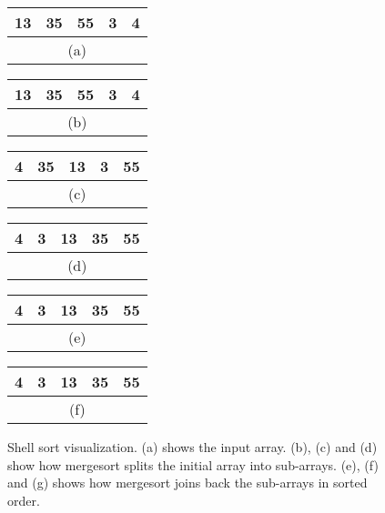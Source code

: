\begin{figure}[!ht]
    \centering
    \begin{tabular}{|c|c|c|c|c|}
    \hline
    13 & 35 & 55 & 3 & 4 \\
    \hline
    \multicolumn{5}{c}{(a)} \\
    \end{tabular}
    \quad\quad\quad
    \begin{tabular}{|c|c|c|c|c|}
    \hline
    \cellcolor{lightgray}13 & 35 & \cellcolor{lightgray}55 & 3 & \cellcolor{lightgray}4 \\
    \hline
    \multicolumn{5}{c}{(b)} \\
    \end{tabular}
    \break
    \begin{tabular}{|c|c|c|c|c|}
    \hline
    \cellcolor{lightgray}4 & 35 & \cellcolor{lightgray}13 & 3 & \cellcolor{lightgray}55 \\
    \hline
    \multicolumn{5}{c}{(c)} \\
    \end{tabular}
    \quad\quad\quad
    \begin{tabular}{|c|c|c|c|c|}
    \hline
    \cellcolor{lightgray}4 & 3 & \cellcolor{lightgray}13 & 35 & \cellcolor{lightgray}55 \\
    \hline
    \multicolumn{5}{c}{(d)} \\
    \end{tabular}
    \break
    \begin{tabular}{|c|c|c|c|c|}
    \hline
    \cellcolor{lightgray}4 & \cellcolor{lightgray}3 & \cellcolor{lightgray}13 & \cellcolor{lightgray}35 & \cellcolor{lightgray}55 \\
    \hline
    \multicolumn{5}{c}{(e)} \\
    \end{tabular}
    \quad\quad\quad
    \begin{tabular}{|c|c|c|c|c|}
    \hline
    \cellcolor{lightgray}4 & \cellcolor{lightgray}3 & \cellcolor{lightgray}13 & \cellcolor{lightgray}35 & \cellcolor{lightgray}55 \\
    \hline
    \multicolumn{5}{c}{(f)} \\
    \end{tabular}
    
    \caption{Shell sort visualization. (a) shows the input array. (b), (c) and (d) show how mergesort splits the initial array into sub-arrays. (e), (f) and (g) shows how mergesort joins back the sub-arrays in sorted order.}
    \label{fig:shellsort_ex}
\end{figure}

